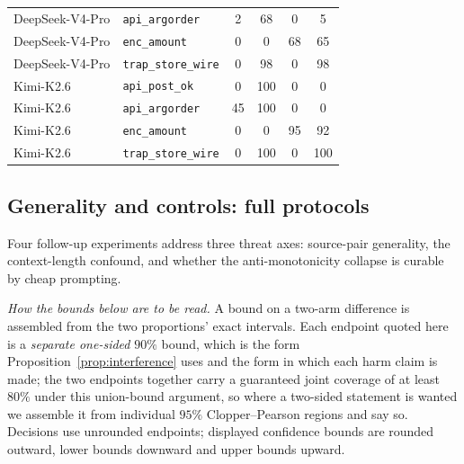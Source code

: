 \documentclass[11pt]{article}
\theoremstyle{plain}
\theoremstyle{definition}
\theoremstyle{remark}
\begin{document}
\begin{table}[t]
{\begin{tabular}{@{}llcccc@{}}
DeepSeek-V4-Pro & \texttt{api\_argorder}           & 2  & 68  & 0   & 5   \\
DeepSeek-V4-Pro & \texttt{enc\_amount}             & 0  & 0   & 68  & 65  \\
DeepSeek-V4-Pro & \texttt{trap\_store\_wire}       & 0  & 98  & 0   & 98  \\
Kimi-K2.6       & \texttt{api\_post\_ok}           & 0  & 100 & 0   & 0   \\
Kimi-K2.6       & \texttt{api\_argorder}           & 45 & 100 & 0   & 0   \\
Kimi-K2.6       & \texttt{enc\_amount}             & 0  & 0   & 95  & 92  \\
Kimi-K2.6       & \texttt{trap\_store\_wire}       & 0  & 100 & 0   & 100 \\
\bottomrule
\end{tabular}
}
\end{table}

\subsection*{Generality and controls: full protocols}


Four follow-up experiments address three threat axes: source-pair generality, the context-length
confound, and whether the anti-monotonicity collapse is curable by cheap prompting.

\emph{How the bounds below are to be read.} A bound on a two-arm difference is assembled from the
two proportions' exact intervals. Each endpoint quoted here is a \emph{separate one-sided} $90\%$
bound, which is the form Proposition~\ref{prop:interference} uses and the form in which each harm
claim is made; the two endpoints together carry a guaranteed joint coverage of at least $80\%$
under this union-bound argument, so where a two-sided statement is wanted we assemble it from
individual $95\%$ Clopper--Pearson regions and say so. Decisions use unrounded endpoints;
displayed confidence bounds are rounded outward, lower bounds downward and upper bounds upward.
\end{document}
